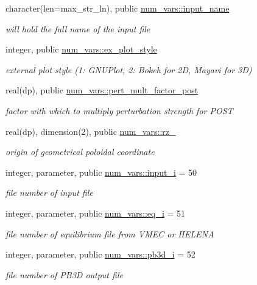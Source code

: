 \begin{DoxyCompactItemize}
character(len=max\+\_\+str\+\_\+ln), public \hyperlink{namespacenum__vars_a1a16a5fdda7aaacdffd14f1ad29f5e8b}{num\+\_\+vars\+::input\+\_\+name}
\begin{DoxyCompactList}\small\item\em will hold the full name of the input file \end{DoxyCompactList}\item 
integer, public \hyperlink{namespacenum__vars_aac52d1fda60883bea62738fe0ecd7527}{num\+\_\+vars\+::ex\+\_\+plot\+\_\+style}
\begin{DoxyCompactList}\small\item\em external plot style (1\+: G\+N\+U\+Plot, 2\+: Bokeh for 2D, Mayavi for 3D) \end{DoxyCompactList}\item 
real(dp), public \hyperlink{namespacenum__vars_aa53d6f71e297c4d8be05907bb7dbffce}{num\+\_\+vars\+::pert\+\_\+mult\+\_\+factor\+\_\+post}
\begin{DoxyCompactList}\small\item\em factor with which to multiply perturbation strength for P\+O\+ST \end{DoxyCompactList}\item 
real(dp), dimension(2), public \hyperlink{namespacenum__vars_aac566d69891d40b90df6b90d18e16039}{num\+\_\+vars\+::rz\+\_}
\begin{DoxyCompactList}\small\item\em origin of geometrical poloidal coordinate \end{DoxyCompactList}\item 
integer, parameter, public \hyperlink{namespacenum__vars_aba3a56e056e4851ee31a33a448613863}{num\+\_\+vars\+::input\+\_\+i} = 50
\begin{DoxyCompactList}\small\item\em file number of input file \end{DoxyCompactList}\item 
integer, parameter, public \hyperlink{namespacenum__vars_a7b97a4fd25cbf874cbfe63417ba307ff}{num\+\_\+vars\+::eq\+\_\+i} = 51
\begin{DoxyCompactList}\small\item\em file number of equilibrium file from V\+M\+EC or H\+E\+L\+E\+NA \end{DoxyCompactList}\item 
integer, parameter, public \hyperlink{namespacenum__vars_aa59942bdbb47a383030d0bcc21e1a3c0}{num\+\_\+vars\+::pb3d\+\_\+i} = 52
\begin{DoxyCompactList}\small\item\em file number of P\+B3D output file \end{DoxyCompactList}\item 

\end{DoxyCompactItemize}
